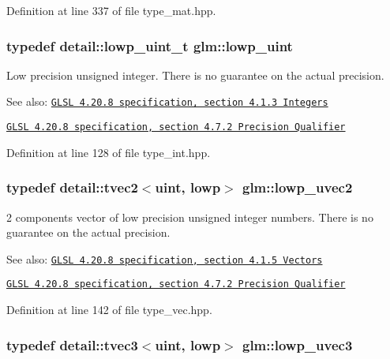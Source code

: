 Definition at line 337 of file type\_\-mat.hpp.\hypertarget{group__core__precision_g8077c90f2c87e419ea6c273157dcc1fc}{
\subsubsection[lowp\_\-uint]{\setlength{\rightskip}{0pt plus 5cm}typedef detail::lowp\_\-uint\_\-t {\bf glm::lowp\_\-uint}}}
\label{group__core__precision_g8077c90f2c87e419ea6c273157dcc1fc}


Low precision unsigned integer. There is no guarantee on the actual precision.

\begin{Desc}
\item[See also:]\href{http://www.opengl.org/registry/doc/GLSLangSpec.4.20.8.pdf}{\tt GLSL 4.20.8 specification, section 4.1.3 Integers} 

\href{http://www.opengl.org/registry/doc/GLSLangSpec.4.20.8.pdf}{\tt GLSL 4.20.8 specification, section 4.7.2 Precision Qualifier} \end{Desc}


Definition at line 128 of file type\_\-int.hpp.\hypertarget{group__core__precision_g06c64bb528bbecf276ab2d4a2b6c934e}{
\subsubsection[lowp\_\-uvec2]{\setlength{\rightskip}{0pt plus 5cm}typedef detail::tvec2$<$uint, lowp$>$ {\bf glm::lowp\_\-uvec2}}}
\label{group__core__precision_g06c64bb528bbecf276ab2d4a2b6c934e}


2 components vector of low precision unsigned integer numbers. There is no guarantee on the actual precision.

\begin{Desc}
\item[See also:]\href{http://www.opengl.org/registry/doc/GLSLangSpec.4.20.8.pdf}{\tt GLSL 4.20.8 specification, section 4.1.5 Vectors} 

\href{http://www.opengl.org/registry/doc/GLSLangSpec.4.20.8.pdf}{\tt GLSL 4.20.8 specification, section 4.7.2 Precision Qualifier} \end{Desc}


Definition at line 142 of file type\_\-vec.hpp.\hypertarget{group__core__precision_g26fd88e52fe7003d41b0c57c5edffd6e}{
\subsubsection[lowp\_\-uvec3]{\setlength{\rightskip}{0pt plus 5cm}typedef detail::tvec3$<$uint, lowp$>$ {\bf glm::lowp\_\-uvec3}}}
\label{group__core__precision_g26fd88e52fe7003d41b0c57c5edffd6e}


